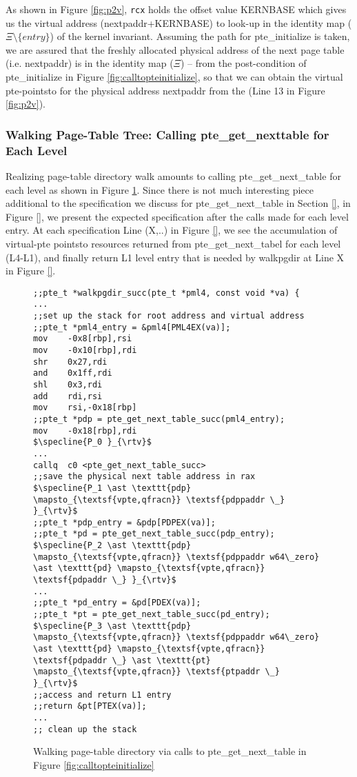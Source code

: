 As shown in Figure \ref{fig:p2v}, \lstinline|rcx| holds the offset value \textsf{KERNBASE} which gives us the virtual address (\textsf{nextpaddr+KERNBASE}) to look-up in the identity map ($\Xi\setminus\{entry\}$) of the kernel invariant. Assuming the path for \textsf{pte\_initialize} is taken, we are assured that the freshly allocated physical address of the next page table (i.e. \textsf{nextpaddr}) is in the identity map ($\Xi$) -- from the post-condition of \textsf{pte\_initialize} in Figure \ref{fig:calltopteinitialize}, so that we can obtain the virtual pte-pointsto for the physical address \textsf{nextpaddr} from the (Line 13 in Figure \ref{fig:p2v}).
\subsubsection{Walking Page-Table Tree: Calling \textsf{pte\_get\_nexttable} for Each Level}
\label{wlkpgdir}
Realizing page-table directory walk amounts to calling \textsf{pte\_get\_next\_table} for each level as shown in Figure \ref{walkpgdir}. Since there is not much interesting piece additional to the specification we discuss for \textsf{pte\_get\_next\_table} in Section \ref{}, in Figure \ref{}, we present the expected specification after the calls made for each level entry. At each specification Line (X,..) in Figure \ref{}, we see the accumulation of virtual-pte pointsto resources returned from \textsf{pte\_get\_next\_tabel} for each level (L4-L1), and finally return L1 level entry that is needed by \textsf{walkpgdir} at Line X in Figure \ref{}. 
\begin{figure}\footnotesize
\begin{lstlisting}[mathescape]
;;pte_t *walkpgdir_succ(pte_t *pml4, const void *va) {
...
;;set up the stack for root address and virtual address    
;;pte_t *pml4_entry = &pml4[PML4EX(va)];
mov    -0x8[rbp],rsi
mov    -0x10[rbp],rdi
shr    0x27,rdi
and    0x1ff,rdi
shl    0x3,rdi
add    rdi,rsi
mov    rsi,-0x18[rbp]
;;pte_t *pdp = pte_get_next_table_succ(pml4_entry);
mov    -0x18[rbp],rdi
$\specline{P_0 }_{\rtv}$
...
callq  c0 <pte_get_next_table_succ>
;;save the physical next table address in rax
$\specline{P_1 \ast \texttt{pdp} \mapsto_{\textsf{vpte,qfracn}} \textsf{pdppaddr \_} }_{\rtv}$
;;pte_t *pdp_entry = &pdp[PDPEX(va)];
;;pte_t *pd = pte_get_next_table_succ(pdp_entry);
$\specline{P_2 \ast \texttt{pdp} \mapsto_{\textsf{vpte,qfracn}} \textsf{pdppaddr w64\_zero} \ast \texttt{pd} \mapsto_{\textsf{vpte,qfracn}} \textsf{pdpaddr \_} }_{\rtv}$
...
;;pte_t *pd_entry = &pd[PDEX(va)];
;;pte_t *pt = pte_get_next_table_succ(pd_entry);
$\specline{P_3 \ast \texttt{pdp} \mapsto_{\textsf{vpte,qfracn}} \textsf{pdppaddr w64\_zero} \ast \texttt{pd} \mapsto_{\textsf{vpte,qfracn}} \textsf{pdpaddr \_} \ast \texttt{pt} \mapsto_{\textsf{vpte,qfracn}} \textsf{ptpaddr \_} }_{\rtv}$
;;access and return L1 entry
;;return &pt[PTEX(va)];
...
;; clean up the stack 
\end{lstlisting}
\vspace{-1em}
\caption{Walking page-table directory via calls to \textsf{pte\_get\_next\_table} in Figure \ref{fig:calltopteinitialize}}
\label{walkpgdir}
\end{figure}
